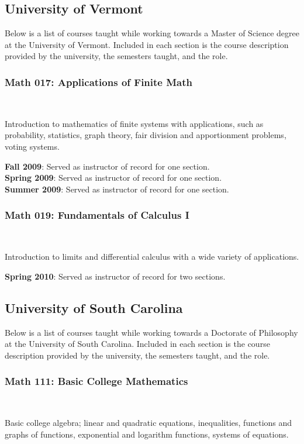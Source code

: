 \documentclass[teaching.portfolio.tex]{subfiles}
\begin{document}
\subsection{University of Vermont}
Below is a list of courses taught while working towards a Master of Science degree at the University of Vermont.
Included in each section is the course description provided by the university, the semesters taught, and the role.
\subsubsection{Math 017: Applications of Finite Math}\hfill\\

\begin{tcolorbox}
  \begin{desc}
    Introduction to mathematics of finite systems with applications, such as probability, statistics, graph theory, fair division and apportionment problems, voting systems.
  \end{desc}
\end{tcolorbox}
\noindent
\textbf{Fall 2009}: Served as instructor of record for one section.\\
\textbf{Spring 2009}: Served as instructor of record for one section.\\
\textbf{Summer 2009}: Served as instructor of record for one section.
\subsubsection{Math 019: Fundamentals of Calculus I}\hfill\\
\begin{tcolorbox}
  \begin{desc}
    Introduction to limits and differential calculus with a wide variety of applications.
  \end{desc}
\end{tcolorbox}

\noindent
\textbf{Spring 2010}: Served as instructor of record for two sections.
\subsection{University of South Carolina}
Below is a list of courses taught while working towards a Doctorate of Philosophy at the University of South Carolina.
Included in each section is the course description provided by the university, the semesters taught, and the role.
\subsubsection{Math 111: Basic College Mathematics}\hfill\\
\begin{tcolorbox}
  \begin{desc}
    Basic college algebra; linear and quadratic equations, inequalities, functions and graphs of functions, exponential and logarithm functions, systems of equations.
  \end{desc}
\end{tcolorbox}
\end{document}
